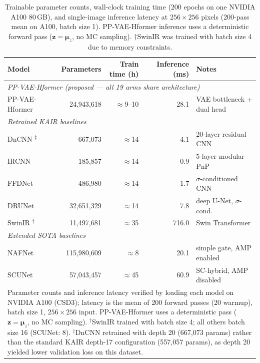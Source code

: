 \documentclass[12pt, a4paper, twoside, openright]{book}
\begin{document}
\begin{table}[H]
\centering
\small
\caption[Trainable parameters, training time, and inference latency per model]{%
  Trainable parameter counts, wall-clock training time (200 epochs on one NVIDIA A100 80\,GB),
  and single-image inference latency at $256{\times}256$ pixels (200-pass mean on A100,
  batch size 1). PP-VAE-Hformer inference uses a deterministic forward pass
  ($\mathbf{z}=\boldsymbol{\mu}_z$, no MC sampling). $\dagger$SwinIR was trained with
  batch size 4 due to memory constraints.}
\label{tab:methods:model_complexity}
\begin{tabular}{lrrrl}
\toprule
\textbf{Model} & \textbf{Parameters} & \textbf{Train time (h)} & \textbf{Inference (ms)} & \textbf{Notes} \\
\midrule
\multicolumn{5}{l}{\textit{PP-VAE-Hformer (proposed — all 19 arms share architecture)}} \\
PP-VAE-Hformer & 24,943,618 & $\approx$9--10 & 28.1 & VAE bottleneck + dual head \\
\midrule
\multicolumn{5}{l}{\textit{Retrained KAIR baselines}} \\
DnCNN \cite{zhang_beyond_2017}$^\ddagger$  & 667,073    & $\approx$14 & 4.1  & 20-layer residual CNN \\
IRCNN \cite{zhang_learning_2017}& 185,857    & $\approx$14 & 0.9  & 5-layer modular PnP \\
FFDNet \cite{zhang_ffdnet_2018} & 486,980    & $\approx$14 & 1.7  & $\sigma$-conditioned CNN \\
DRUNet \cite{zhang_drunet_2021} & 32,651,329 & $\approx$14 & 7.8  & deep U-Net, $\sigma$-cond.\ \\
SwinIR \cite{liang_swinir_2021}$^\dagger$ & 11,497,681 & $\approx$35 & 716.0 & Swin Transformer \\
\midrule
\multicolumn{5}{l}{\textit{Extended SOTA baselines}} \\
NAFNet \cite{chen_nafnet_2022}  & 115,980,609 & $\approx$8  & 20.1  & simple gate, AMP enabled \\
SCUNet \cite{zhang_scunet_2023} & 57,043,457  & $\approx$45 & 60.9  & SC-hybrid, AMP disabled \\
\bottomrule
\multicolumn{5}{p{0.94\linewidth}}{\footnotesize
  Parameter counts and inference latency verified by loading each model on NVIDIA A100 (CSD3);
  latency is the mean of 200 forward passes (20 warmup), batch size 1, $256{\times}256$ input.
  PP-VAE-Hformer uses a deterministic pass ($\mathbf{z}=\boldsymbol{\mu}_z$, no MC sampling).
  $^\dagger$SwinIR trained with batch size 4; all others batch size 16 (SCUNet: 8).
  $^\ddagger$DnCNN retrained with depth 20 (667,073 params) rather than the standard KAIR depth-17
  configuration (557,057 params), as depth 20 yielded lower validation loss on this dataset.} \\
\end{tabular}
\end{table}
\end{document}
